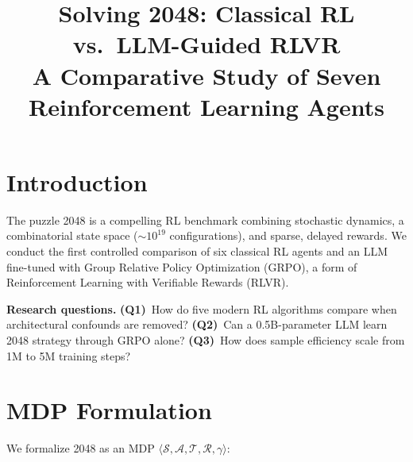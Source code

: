 \documentclass[conference, 10pt]{IEEEtran}
\begin{document}

\title{\LARGE Solving 2048: Classical RL vs.\ LLM-Guided RLVR\\[4pt]
\large A Comparative Study of Seven Reinforcement Learning Agents}

\author{
}

\maketitle
\thispagestyle{plain}

\section{Introduction}

The puzzle 2048 is a compelling RL benchmark combining stochastic dynamics, a combinatorial state space ($\sim\!10^{19}$ configurations), and sparse, delayed rewards.  We conduct the first controlled comparison of six classical RL agents and an LLM fine-tuned with Group Relative Policy Optimization (GRPO), a form of Reinforcement Learning with Verifiable Rewards (RLVR).

\textbf{Research questions.}
\textbf{(Q1)}~How do five modern RL algorithms compare when architectural confounds are removed?
\textbf{(Q2)}~Can a 0.5B-parameter LLM learn 2048 strategy through GRPO alone?
\textbf{(Q3)}~How does sample efficiency scale from 1M to 5M training steps?

\section{MDP Formulation}
\label{sec:mdp}

We formalize 2048 as an MDP $\langle \mathcal{S}, \mathcal{A}, \mathcal{T}, \mathcal{R}, \gamma \rangle$:
\end{document}
